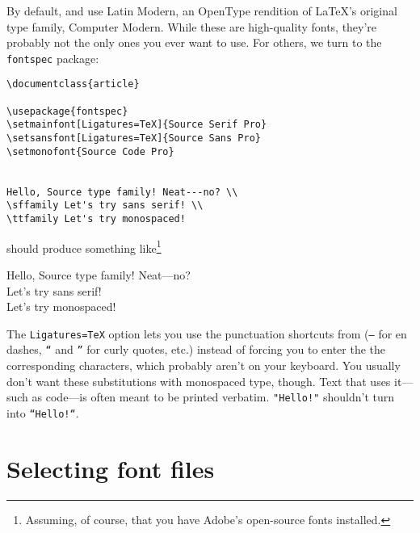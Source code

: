 By default, \LuaLaTeX{} and \XeLaTeX{} use Latin Modern,
an OpenType rendition of \LaTeX's original type family, Computer Modern.
While these are high-quality fonts,
they're probably not the only ones you ever want to use.
For others, we turn to the \texttt{fontspec} package:
\begin{leftfigure}
\begin{lstlisting}
\documentclass{article}

\usepackage{fontspec}
\setmainfont[Ligatures=TeX]{Source Serif Pro}
\setsansfont[Ligatures=TeX]{Source Sans Pro}
\setmonofont{Source Code Pro}


Hello, Source type family! Neat---no? \\
\sffamily Let's try sans serif! \\
\ttfamily Let's try monospaced!

\end{lstlisting}
\end{leftfigure}
should produce something like\footnote{Assuming, of course,
that you have Adobe's open-source fonts installed.\punckern{}}
\begin{leftfigure}
 Hello, Source type family! Neat---no? \\
 Let's try sans serif! \\
 Let's try monospaced!
\end{leftfigure}
The \verb|Ligatures=TeX| option lets you use the punctuation
shortcuts from  (\texttt{--} for en dashes,
\texttt{``} and \texttt{''} for curly quotes, etc.)
instead of forcing you to enter the the corresponding characters,
which probably aren't on your keyboard.
You usually don't want these substitutions with monospaced type, though.
Text that uses it---such as code---is often meant to be printed
verbatim. \verb|"Hello!"| shouldn't turn into
\verb|“Hello!“|.

\section{Selecting font files}

